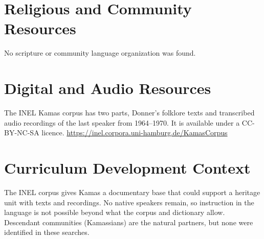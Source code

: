 \documentclass[12pt]{article}
\begin{document}
\section{Religious and Community Resources}
No scripture or community language organization was found.

\section{Digital and Audio Resources}
The INEL Kamas corpus has two parts, Donner's folklore texts and transcribed audio recordings of the last speaker from 1964--1970. It is available under a CC-BY-NC-SA licence. \url{https://inel.corpora.uni-hamburg.de/KamasCorpus}

\section{Curriculum Development Context}
The INEL corpus gives Kamas a documentary base that could support a heritage unit with texts and recordings. No native speakers remain, so instruction in the language is not possible beyond what the corpus and dictionary allow. Descendant communities (Kamassians) are the natural partners, but none were identified in these searches.
\end{document}
